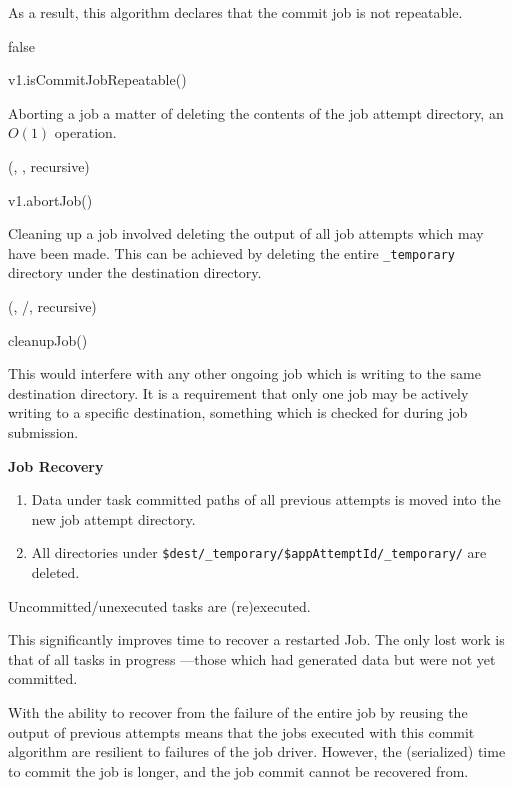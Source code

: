 \documentclass[conference]{IEEEtran}
\begin{document}
As a result, this algorithm declares that the commit job is not repeatable.

\begin{function}
  false\;
\caption{v1.isCommitJobRepeatable()}
\label{v1.isCommitJobRepeatable}

\end{function}

Aborting a job a matter of deleting the contents of the
job attempt directory, an $O(1)$ operation.

\begin{procedure}
\FileOutputCommitVars
  \delete(\fs, \jobAttemptPath, recursive)\;
\caption{v1.abortJob()}
\label{v1.abortJob}

\end{procedure}

Cleaning up a job involved deleting the output of all job attempts which
may have been made.
This can be achieved by deleting the entire \texttt{_temporary} directory
under the destination directory.

\begin{procedure}
\FileOutputCommitVars
  \delete(\fs, \dest/\temp, recursive)\;
\caption{cleanupJob()}
\label{cleanupJob}
\end{procedure}

This would interfere with any other ongoing job which is writing to the
same destination directory.
It is a requirement that only one job may be actively writing
to a specific destination, something which is checked for during job submission.


\textbf{Job Recovery}

\begin{enumerate}

\item Data under task committed paths of all previous attempts is moved
into the new job attempt directory.
\item All directories under \texttt{\$dest/\_temporary/\$appAttemptId/\_temporary/}
are deleted.
\end{enumerate}

Uncommitted/unexecuted tasks are (re)executed.

This significantly improves time to recover a restarted Job.
The only lost work is that of all tasks in progress ---those which had generated
data but were not yet committed.


With the ability to recover from the failure of the entire job by
reusing the output of previous attempts means that the jobs executed
with this commit algorithm are resilient to failures of the job driver.
However, the (serialized) time to commit the job is longer, and the job
commit cannot be recovered from.
\end{document}
